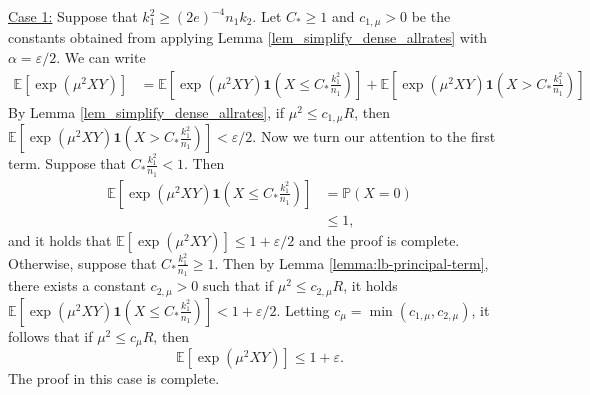 \documentclass{article}
\newcommand{\bbP}{\mathbb{P}}
\newcommand{\EE}{\mathbb{E}}
\newcommand{\one}{\mathbf{1}}
\newcommand{\eps}{\varepsilon} %
\newcommand{\Ct}{C_{*}}
\begin{document}
\noindent\underline{Case 1:} Suppose that $k_1^2 \geq (2e)^{-4}n_1k_2$. Let $\Ct \geq 1$ and $c_{1, \mu} > 0$ be the constants obtained from applying Lemma \ref{lem_simplify_dense_allrates} with $\alpha = \eps/2$. We can write
\begin{align*}
\EE[\exp(\mu^2XY)] &= \EE[\exp(\mu^2XY)\one(X \leq \Ct \frac{k_1^2}{n_1})] + \EE[\exp(\mu^2XY)\one(X > \Ct \frac{k_1^2}{n_1})]
\end{align*}
By Lemma \ref{lem_simplify_dense_allrates}, if $\mu^2 \leq c_{1, \mu}R$, then $\EE[\exp(\mu^2XY)\one(X > \Ct \frac{k_1^2}{n_1})] < \eps/2$.
Now we turn our attention to the first term. Suppose that $\Ct \frac{k_1^2}{n_1} < 1$. Then
\begin{align*}
    \EE[\exp(\mu^2XY)\one(X \leq \Ct \frac{k_1^2}{n_1})] &= \bbP(X = 0) \\
    &\leq 1,
\end{align*}
and it holds that $\EE[\exp(\mu^2XY)] \leq 1+\eps/2$ and the proof is complete. Otherwise, suppose that $\Ct \frac{k_1^2}{n_1} \geq 1$. Then by Lemma \ref{lemma:lb-principal-term}, there exists a constant $c_{2, \mu} > 0$ such that if $\mu^2 \leq c_{2, \mu}R$, it holds $\EE[\exp(\mu^2XY)\one(X \leq \Ct \frac{k_1^2}{n_1})] < 1 + \eps/2$. Letting $c_\mu = \min(c_{1, \mu}, c_{2, \mu})$, it follows that if $\mu^2 \leq c_\mu R$, then
\[\EE[\exp(\mu^2XY)] \leq 1+\eps.\]
The proof in this case is complete.

\bigskip 
\end{document}
